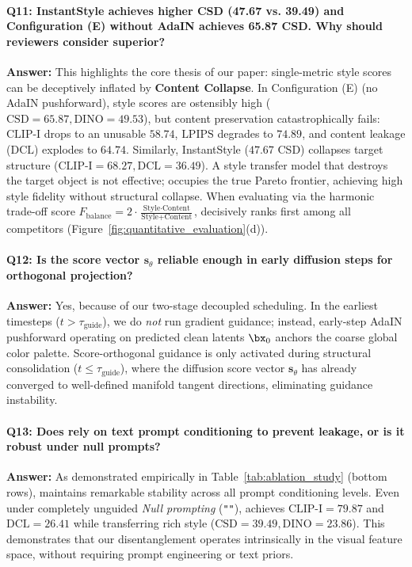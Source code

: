 \paragraph{Q11: InstantStyle achieves higher CSD (47.67 vs. 39.49) and Configuration (E) without AdaIN achieves 65.87 CSD. Why should reviewers consider \method superior?}
\textbf{Answer:} This highlights the core thesis of our paper: single-metric style scores can be deceptively inflated by \textbf{Content Collapse}. In Configuration (E) (no AdaIN pushforward), style scores are ostensibly high ($\text{CSD} = 65.87, \text{DINO} = 49.53$), but content preservation catastrophically fails: $\text{CLIP-I}$ drops to an unusable $58.74$, $\text{LPIPS}$ degrades to $74.89$, and content leakage ($\text{DCL}$) explodes to $64.74$. Similarly, InstantStyle ($47.67$ CSD) collapses target structure ($\text{CLIP-I} = 68.27, \text{DCL} = 36.49$). A style transfer model that destroys the target object is not effective; \method occupies the true Pareto frontier, achieving high style fidelity without structural collapse. When evaluating via the harmonic trade-off score $F_{\text{balance}} = 2 \cdot \frac{\text{Style} \cdot \text{Content}}{\text{Style} + \text{Content}}$, \method decisively ranks first among all competitors (Figure~\ref{fig:quantitative_evaluation}(d)).

\paragraph{Q12: Is the score vector $\mathbf{s}_\theta$ reliable enough in early diffusion steps for orthogonal projection?}
\textbf{Answer:} Yes, because of our two-stage decoupled scheduling. In the earliest timesteps ($t > \tau_{\text{guide}}$), we do \textit{not} run gradient guidance; instead, early-step AdaIN pushforward operating on predicted clean latents $\bx_0$ anchors the coarse global color palette. Score-orthogonal guidance is only activated during structural consolidation ($t \le \tau_{\text{guide}}$), where the diffusion score vector $\mathbf{s}_\theta$ has already converged to well-defined manifold tangent directions, eliminating guidance instability.

\paragraph{Q13: Does \method rely on text prompt conditioning to prevent leakage, or is it robust under null prompts?}
\textbf{Answer:} As demonstrated empirically in Table~\ref{tab:ablation_study} (bottom rows), \method maintains remarkable stability across all prompt conditioning levels. Even under completely unguided \textit{Null prompting} (\texttt{""}), \method achieves $\text{CLIP-I} = 79.87$ and $\text{DCL} = 26.41$ while transferring rich style ($\text{CSD} = 39.49, \text{DINO} = 23.86$). This demonstrates that our disentanglement operates intrinsically in the visual feature space, without requiring prompt engineering or text priors.

